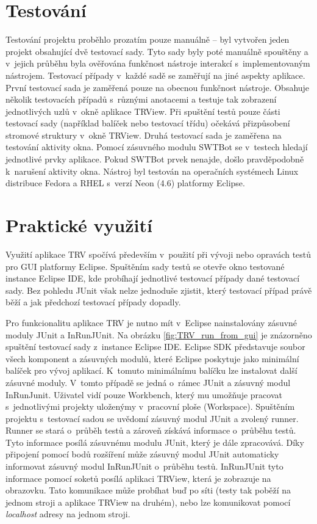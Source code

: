   \section{Testování}
  Testování projektu proběhlo prozatím pouze manuálně -- byl vytvořen jeden projekt obsahující dvě testovací sady. Tyto sady byly poté manuálně spouštěny a v~jejich průběhu byla ověřována funkčnost nástroje interakcí s~implementovaným nástrojem. Testovací případy v~každé sadě se zaměřují na jiné aspekty aplikace. První testovací sada je zaměřená pouze na obecnou funkčnost nástroje. Obsahuje několik testovacích případů s~různými anotacemi a testuje tak zobrazení jednotlivých uzlů v~okně aplikace TRView. Při spuštění testů pouze části testovací sady (například balíček nebo testovací třídu) očekává přizpůsobení stromové struktury v~okně TRView. Druhá testovací sada je zaměřena na testování aktivity okna. Pomocí zásuvného modulu SWTBot se v~testech hledají jednotlivé prvky aplikace. Pokud SWTBot prvek nenajde, došlo pravděpodobně k~narušení aktivity okna. Nástroj byl testován na operačních systémech Linux distribuce Fedora a RHEL s~verzí Neon (4.6) platformy Eclipse.

  \section{Praktické využití}
  Využití aplikace TRV spočívá především v~použití při vývoji nebo opravách testů pro GUI platformy Eclipse. Spuštěním sady testů se otevře okno testované instance Eclipse IDE, kde probíhají jednotlivé testovací případy dané testovací sady. Bez pohledu JUnit však nelze jednoduše zjistit, který testovací případ právě běží a jak předchozí testovací případy dopadly.

  Pro funkcionalitu aplikace TRV je nutno mít v~Eclipse nainstalovány zásuvné moduly JUnit a InRunJUnit. Na obrázku \ref{fig:TRV_run_from_gui} je znázorněno spuštění testovací sady z~instance Eclipse IDE. Eclipse SDK představuje soubor všech komponent a zásuvných modulů, které Eclipse poskytuje jako minimální balíček pro vývoj aplikací. K~tomuto minimálnímu balíčku lze instalovat další zásuvné moduly. V~tomto případě se jedná o~rámec JUnit a zásuvný modul InRunJunit. Uživatel vidí pouze Workbench, který mu umožňuje pracovat s~jednotlivými projekty uloženýmy v~pracovní ploše (Workspace). Spuštěním projektu s~testovací sadou se uvědomí zásuvný modul JUnit a zvolený runner. Runner se stará o~průběh testů a zároveň získává informace o~průběhu testů. Tyto informace posílá zásuvnému modulu JUnit, který je dále zpracovává. Díky připojení pomocí bodů rozšíření může zásuvný modul JUnit automaticky informovat zásuvný modul InRunJUnit o~průběhu testů. InRunJUnit tyto informace pomocí soketů posílá aplikaci TRView, která je zobrazuje na obrazovku. Tato komunikace může probíhat buď po síti (testy tak poběží na jednom stroji a aplikace TRView na druhém), nebo lze komunikovat pomocí \emph{localhost} adresy na jednom stroji.

